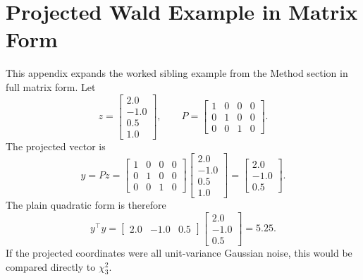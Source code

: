 
\section{Projected Wald Example in Matrix Form}
\label{app:projected-wald-example}

This appendix expands the worked sibling example from the Method section in
full matrix form. Let
\begin{equation}
z =
\begin{bmatrix}
2.0\\
-1.0\\
0.5\\
1.0
\end{bmatrix},
\qquad
P =
\begin{bmatrix}
1&0&0&0\\
0&1&0&0\\
0&0&1&0
\end{bmatrix}.
\end{equation}
The projected vector is
\begin{equation}
y = Pz =
\begin{bmatrix}
1&0&0&0\\
0&1&0&0\\
0&0&1&0
\end{bmatrix}
\begin{bmatrix}
2.0\\
-1.0\\
0.5\\
1.0
\end{bmatrix}
=
\begin{bmatrix}
2.0\\
-1.0\\
0.5
\end{bmatrix}.
\end{equation}
The plain quadratic form is therefore
\begin{equation}
y^\top y
=
\begin{bmatrix}
2.0 & -1.0 & 0.5
\end{bmatrix}
\begin{bmatrix}
2.0\\
-1.0\\
0.5
\end{bmatrix}
=
5.25.
\end{equation}
If the projected coordinates were all unit-variance Gaussian noise, this would
be compared directly to $\chi^2_3$.

